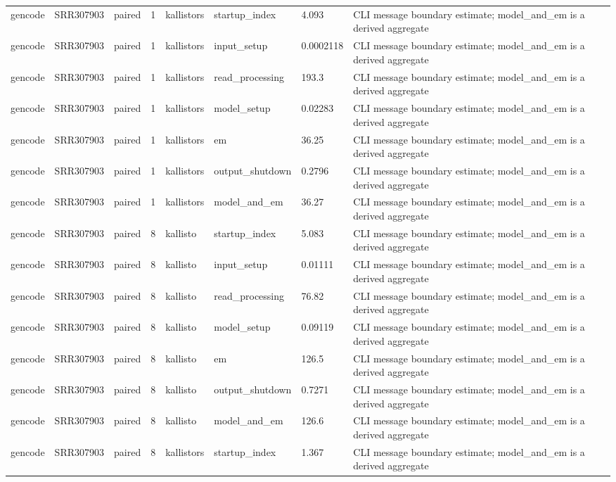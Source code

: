 \begin{tabular}{llllllll}
gencode & SRR307903 & paired & 1 & kallistors & startup\_index & 4.093 & CLI message boundary estimate; model\_and\_em is a derived aggregate \\
gencode & SRR307903 & paired & 1 & kallistors & input\_setup & 0.0002118 & CLI message boundary estimate; model\_and\_em is a derived aggregate \\
gencode & SRR307903 & paired & 1 & kallistors & read\_processing & 193.3 & CLI message boundary estimate; model\_and\_em is a derived aggregate \\
gencode & SRR307903 & paired & 1 & kallistors & model\_setup & 0.02283 & CLI message boundary estimate; model\_and\_em is a derived aggregate \\
gencode & SRR307903 & paired & 1 & kallistors & em & 36.25 & CLI message boundary estimate; model\_and\_em is a derived aggregate \\
gencode & SRR307903 & paired & 1 & kallistors & output\_shutdown & 0.2796 & CLI message boundary estimate; model\_and\_em is a derived aggregate \\
gencode & SRR307903 & paired & 1 & kallistors & model\_and\_em & 36.27 & CLI message boundary estimate; model\_and\_em is a derived aggregate \\
gencode & SRR307903 & paired & 8 & kallisto & startup\_index & 5.083 & CLI message boundary estimate; model\_and\_em is a derived aggregate \\
gencode & SRR307903 & paired & 8 & kallisto & input\_setup & 0.01111 & CLI message boundary estimate; model\_and\_em is a derived aggregate \\
gencode & SRR307903 & paired & 8 & kallisto & read\_processing & 76.82 & CLI message boundary estimate; model\_and\_em is a derived aggregate \\
gencode & SRR307903 & paired & 8 & kallisto & model\_setup & 0.09119 & CLI message boundary estimate; model\_and\_em is a derived aggregate \\
gencode & SRR307903 & paired & 8 & kallisto & em & 126.5 & CLI message boundary estimate; model\_and\_em is a derived aggregate \\
gencode & SRR307903 & paired & 8 & kallisto & output\_shutdown & 0.7271 & CLI message boundary estimate; model\_and\_em is a derived aggregate \\
gencode & SRR307903 & paired & 8 & kallisto & model\_and\_em & 126.6 & CLI message boundary estimate; model\_and\_em is a derived aggregate \\
gencode & SRR307903 & paired & 8 & kallistors & startup\_index & 1.367 & CLI message boundary estimate; model\_and\_em is a derived aggregate \\

\end{tabular}

